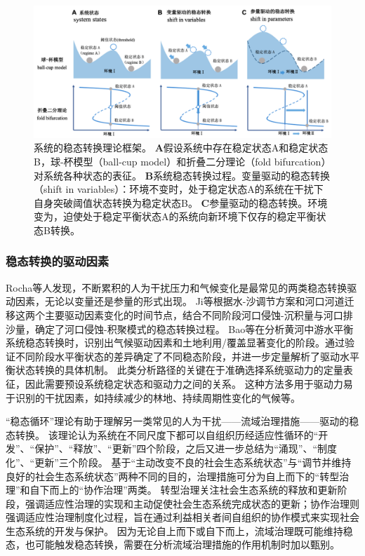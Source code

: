 \begin{figure}[!ht] %
    \centering
    \includegraphics[width=\textwidth]{img/ch1/ch1_regime_shift.png}
    \caption[系统的稳态转换理论框架]{系统的稳态转换理论框架。
    \textbf{A}假设系统中存在稳定状态A和稳定状态B，球-杯模型（ball-cup model）和折叠二分理论（fold bifurcation）对系统各种状态的表征。
    \textbf{B}系统稳态转换过程。变量驱动的稳态转换（shift in variables）：环境不变时，处于稳定状态A的系统在干扰下自身突破阈值状态转换为稳定状态B。
    \textbf{C}参量驱动的稳态转换。环境变为，迫使处于稳定平衡状态A的系统向新环境下仅存的稳定平衡状态B转换。}\label{ch1:fig:regime_shift}
\end{figure}

\subsubsection{稳态转换的驱动因素}

Rocha等人发现，不断累积的人为干扰压力和气候变化是最常见的两类稳态转换驱动因素，无论以变量还是参量的形式出现\cite{rocha2018}。
Ji等根据水-沙调节方案和河口河道迁移这两个主要驱动因素变化的时间节点，结合不同阶段河口侵蚀-沉积量与河口排沙量，确定了河口侵蚀-积聚模式的稳态转换过程\cite{ji2018}。
Bao等在分析黄河中游水平衡系统稳态转换时，识别出气候驱动因素和土地利用/覆盖显著变化的阶段。通过验证不同阶段水平衡状态的差异确定了不同稳态阶段，并进一步定量解析了驱动水平衡状态转换的具体机制\cite{bao2019}。
此类分析路径的关键在于准确选择系统驱动力的定量表征，因此需要预设系统稳定状态和驱动力之间的关系。
这种方法多用于驱动力易于识别的干扰因素，如持续减少的林地、持续周期性变化的气候等。

“稳态循环”理论有助于理解另一类常见的人为干扰——流域治理措施——驱动的稳态转换。
该理论认为系统在不同尺度下都可以自组织历经适应性循环的“开发”、“保护”、“释放”、“更新”四个阶段\cite{gunderson2001}，之后又进一步总结为“涌现”、“制度化”、“更新”三个阶段。
基于“主动改变不良的社会\textendash{}生态系统状态”与“调节并维持良好的社会\textendash{}生态系统状态”两种不同的目的，治理措施可分为自上而下的“转型治理”和自下而上的“协作治理”两类\cite{song2019}。
转型治理关注社会\textendash{}生态系统的释放和更新阶段，强调适应性治理的实现和主动促使社会\textendash{}生态系统完成状态的更新；协作治理则强调适应性治理制度化过程，旨在通过利益相关者间自组织的协作模式来实现社会\textendash{}生态系统的开发与保护\cite{song2019}。
因为无论自上而下或自下而上，流域治理既可能维持稳态，也可能触发稳态转换，需要在分析流域治理措施的作用机制时加以甄别。

